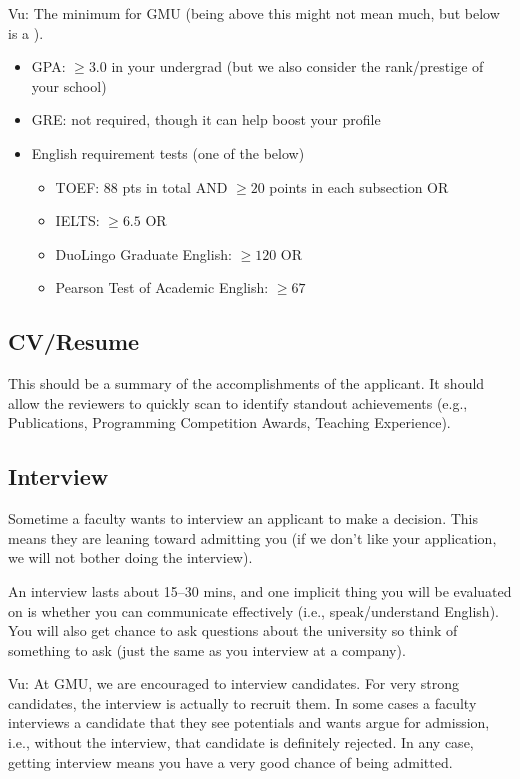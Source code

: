 \documentclass[11pt]{article}
\newenvironment{commentbox}{
 \small
    \begin{cbox}
 }{
   \end{cbox}
}
\newcommand{\red}[1]{{\color{red}{#1}}}
\begin{document}
\begin{commentbox}
Vu: The minimum for GMU (being above this might not mean much, but below is a \red{red flag}).
\begin{itemize}
\item GPA: $\ge 3.0$ in your undergrad (but we also consider the rank/prestige of your school)
\item GRE: not required, though it can help boost your profile
\item English requirement tests (one of the below)
  \begin{itemize}    
  \item TOEF: 88 pts in total AND $\ge 20$ points in each subsection OR
  \item IELTS: $\ge 6.5$ OR
  \item DuoLingo Graduate English: $\ge 120$ OR 
  \item Pearson Test of Academic English: $\ge 67$
  \end{itemize}  
\end{itemize}
\end{commentbox}


\subsection{CV/Resume}
This should be a summary of the accomplishments of the applicant.  It should allow the reviewers to quickly scan to identify standout achievements (e.g., Publications, Programming Competition Awards, Teaching Experience).

\subsection{Interview}

Sometime a faculty wants to interview an applicant to make a decision. This means they are leaning toward admitting you (if we don't like your application, we will not bother doing the interview).

An interview lasts about 15--30 mins, and one implicit thing you will be evaluated on is whether you can communicate effectively (i.e., speak/understand English).  You will also get chance to ask questions about the university so think of something to ask (just the same as you interview at a company).

\begin{commentbox}
Vu: At GMU, we are encouraged to interview candidates. For very strong candidates, the interview is actually to recruit them.  In some cases a faculty interviews a candidate that they see potentials and wants argue for admission, i.e., without the interview, that candidate is definitely rejected. In any case, getting interview means you have a very good chance of being admitted.
\end{commentbox}
\end{document}
